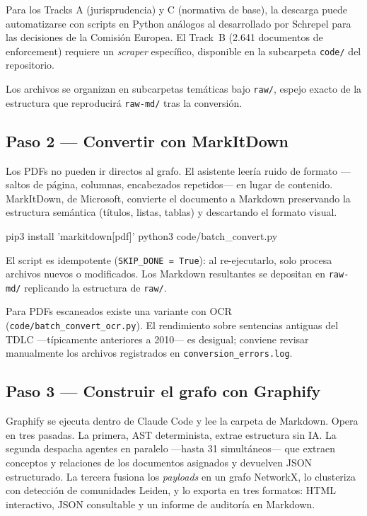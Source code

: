 \documentclass[12pt,a4paper]{article}
\begin{document}
Para los Tracks A (jurisprudencia) y C (normativa de base), la descarga puede
automatizarse con scripts en Python análogos al desarrollado por Schrepel para
las decisiones de la Comisión Europea.\autocite{schrepel2026brain} El Track~B
(2.641 documentos de enforcement) requiere un \emph{scraper} específico,
disponible en la subcarpeta \texttt{code/} del repositorio.

Los archivos se organizan en subcarpetas temáticas bajo \texttt{raw/}, espejo
exacto de la estructura que reproducirá \texttt{raw-md/} tras la conversión.

\subsection{Paso 2 — Convertir con MarkItDown}

Los PDFs no pueden ir directos al grafo. El asistente leería ruido de formato
—saltos de página, columnas, encabezados repetidos— en lugar de contenido.
MarkItDown, de Microsoft, convierte el documento a Markdown preservando la
estructura semántica (títulos, listas, tablas) y descartando el formato
visual.\autocite{microsoft2024markitdown}

\begin{codebox}
pip3 install 'markitdown[pdf]'
python3 code/batch_convert.py
\end{codebox}

El script es idempotente (\texttt{SKIP\_DONE = True}): al re-ejecutarlo, solo
procesa archivos nuevos o modificados. Los Markdown resultantes se depositan en
\texttt{raw-md/} replicando la estructura de \texttt{raw/}.

Para PDFs escaneados existe una variante con OCR
(\texttt{code/batch\_convert\_ocr.py}). El rendimiento sobre sentencias antiguas
del TDLC —típicamente anteriores a 2010— es desigual; conviene revisar
manualmente los archivos registrados en \texttt{conversion\_errors.log}.

\subsection{Paso 3 — Construir el grafo con Graphify}

Graphify se ejecuta dentro de Claude Code y lee la carpeta de
Markdown.\autocite{shamsi2025graphify} Opera en tres pasadas. La primera, AST
determinista, extrae estructura sin IA. La segunda despacha agentes en paralelo
—hasta 31 simultáneos— que extraen conceptos y relaciones de los documentos
asignados y devuelven JSON estructurado. La tercera fusiona los \emph{payloads}
en un grafo NetworkX, lo clusteriza con detección de comunidades Leiden, y lo
exporta en tres formatos: HTML interactivo, JSON consultable y un informe de
auditoría en Markdown.
\end{document}
